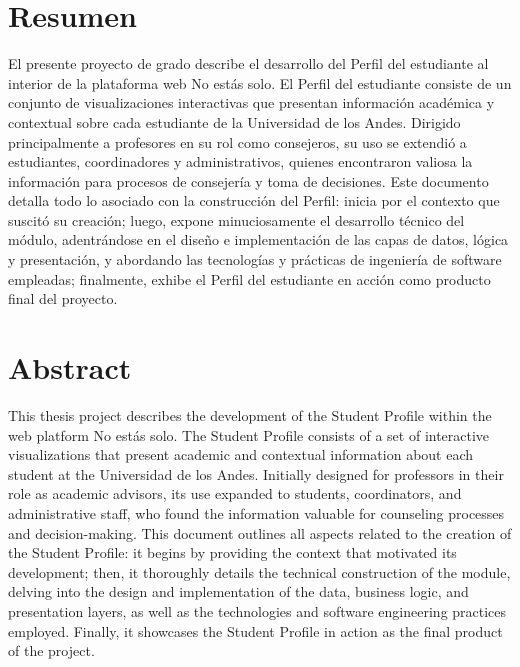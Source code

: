 \section*{\centering Resumen}

\begin{spacing}{1.5}
	El presente proyecto de grado describe el desarrollo del Perfil del estudiante al interior de la plataforma web No estás solo. El Perfil del estudiante consiste de un conjunto de visualizaciones interactivas que presentan información académica y contextual sobre cada estudiante de la Universidad de los Andes. Dirigido principalmente a profesores en su rol como consejeros, su uso se extendió a estudiantes, coordinadores y administrativos, quienes encontraron valiosa la información para procesos de consejería y toma de decisiones. Este documento detalla todo lo asociado con la construcción del Perfil: inicia por el contexto que suscitó su creación; luego, expone minuciosamente el desarrollo técnico del módulo, adentrándose en el diseño e implementación de las capas de datos, lógica y presentación, y abordando las tecnologías y prácticas de ingeniería de software empleadas; finalmente, exhibe el Perfil del estudiante en acción como producto final del proyecto.
\end{spacing}

\section*{\centering Abstract}

\begin{spacing}{1.5}
	This thesis project describes the development of the Student Profile within the web platform No estás solo. The Student Profile consists of a set of interactive visualizations that present academic and contextual information about each student at the Universidad de los Andes. Initially designed for professors in their role as academic advisors, its use expanded to students, coordinators, and administrative staff, who found the information valuable for counseling processes and decision-making. This document outlines all aspects related to the creation of the Student Profile: it begins by providing the context that motivated its development; then, it thoroughly details the technical construction of the module, delving into the design and implementation of the data, business logic, and presentation layers, as well as the technologies and software engineering practices employed. Finally, it showcases the Student Profile in action as the final product of the project.
\end{spacing}
